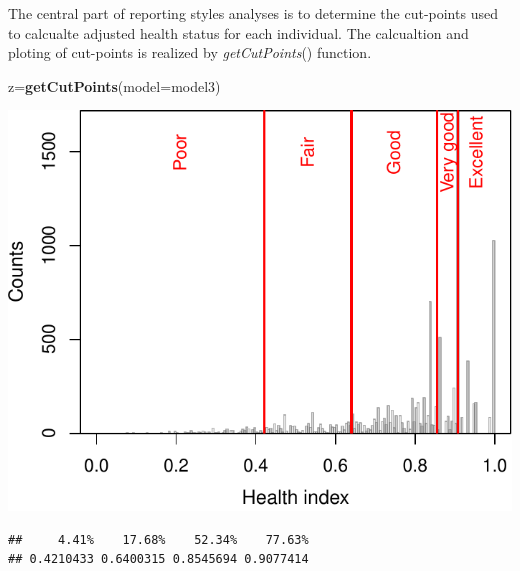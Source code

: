 \documentclass[]{article}
\newenvironment{Shaded}{\begin{snugshade}}{\end{snugshade}}
\newcommand{\CommentTok}[1]{\textcolor[rgb]{0.56,0.35,0.01}{\textit{#1}}}
\newcommand{\DataTypeTok}[1]{\textcolor[rgb]{0.13,0.29,0.53}{#1}}
\newcommand{\KeywordTok}[1]{\textcolor[rgb]{0.13,0.29,0.53}{\textbf{#1}}}
\newcommand{\NormalTok}[1]{#1}
\newcommand{\OperatorTok}[1]{\textcolor[rgb]{0.81,0.36,0.00}{\textbf{#1}}}
\begin{document}
The central part of reporting styles analyses is to determine the
cut-points used to calcualte adjusted health status for each individual.
The calcualtion and ploting of cut-points is realized by
\emph{getCutPoints}() function.

\begin{Shaded}
\begin{Highlighting}[]
\NormalTok{z=}\KeywordTok{getCutPoints}\NormalTok{(}\DataTypeTok{model=}\NormalTok{model3)}
\end{Highlighting}
\end{Shaded}

\begin{center}\includegraphics{vignette_files/figure-latex/unnamed-chunk-19-1} \end{center}

\begin{Shaded}
\end{Shaded}

\begin{verbatim}
##     4.41%    17.68%    52.34%    77.63% 
## 0.4210433 0.6400315 0.8545694 0.9077414
\end{verbatim}

\begin{Shaded}
\end{Shaded}
\end{document}
